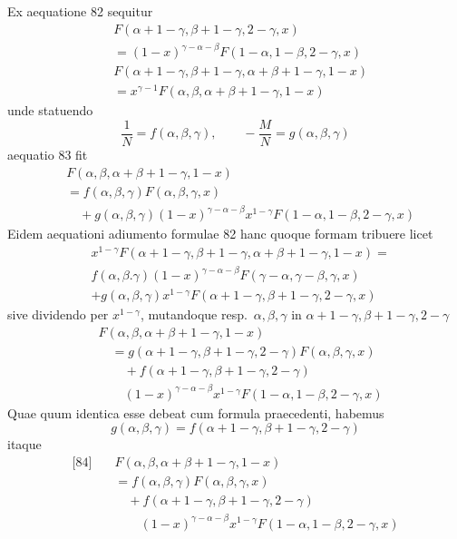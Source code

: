 
Ex aequatione 82 sequitur
\[
\begin{aligned}
&F(\alpha+1-\gamma,\beta+1-\gamma,2-\gamma,x)\\&=(1-x)^{\gamma-\alpha-\beta}F(1-\alpha,1-\beta,2-\gamma,x)\\[5pt]
&F(\alpha+1-\gamma,\beta+1-\gamma,\alpha+\beta+1-\gamma,1-x)\\&=x^{\gamma-1}F(\alpha,\beta,\alpha+\beta+1-\gamma,1-x)
\end{aligned}
\]
unde statuendo
\[
\frac{1}{N}=f(\alpha,\beta,\gamma),\qquad-\frac{M}{N}=g(\alpha,\beta,\gamma)
\]
aequatio 83 fit
\[
\begin{aligned}
&F(\alpha,\beta,\alpha+\beta+1-\gamma,1-x)\\&=f(\alpha,\beta,\gamma)F(\alpha,\beta,\gamma,x)\\
&\quad+g(\alpha,\beta,\gamma)(1-x)^{\gamma-\alpha-\beta}x^{1-\gamma}F(1-\alpha,1-\beta,2-\gamma,x)
\end{aligned}
\]
Eidem aequationi adiumento formulae 82 hanc quoque formam tribuere licet
\[
\begin{aligned}
&x^{1-\gamma}F(\alpha+1-\gamma,\beta+1-\gamma,\alpha+\beta+1-\gamma,1-x)=\\
&f(\alpha,\beta.\gamma)(1-x)^{\gamma-\alpha-\beta}F(\gamma-\alpha,\gamma-\beta,\gamma,x)
\\&+g(\alpha,\beta,\gamma)x^{1-\gamma}F(\alpha+1-\gamma,\beta+1-\gamma,2-\gamma,x)
\end{aligned}
\]
sive dividendo per \(x^{1-\gamma}\), mutandoque resp.\ \(\alpha,\beta,\gamma\) in \(\alpha+1-\gamma,\beta+1-\gamma,2-\gamma\)
\[
\begin{aligned}
&F(\alpha,\beta,\alpha+\beta+1-\gamma,1-x)\\
&\quad=g(\alpha+1-\gamma,\beta+1-\gamma,2-\gamma)F(\alpha,\beta,\gamma,x)\\
&\qquad+f(\alpha+1-\gamma,\beta+1-\gamma,2-\gamma)\\&\qquad(1-x)^{\gamma-\alpha-\beta}x^{1-\gamma}F(1-\alpha,1-\beta,2-\gamma,x)
\end{aligned}
\]
Quae quum identica esse debeat cum formula praecedenti, habemus
\[
g(\alpha,\beta,\gamma)=f(\alpha+1-\gamma,\beta+1-\gamma,2-\gamma)
\]
itaque
\[
\begin{aligned}
\text{[84]}\quad &F(\alpha,\beta,\alpha+\beta+1-\gamma,1-x)\\
&=f(\alpha,\beta,\gamma)F(\alpha,\beta,\gamma,x)\\
&\quad+f(\alpha+1-\gamma,\beta+1-\gamma,2-\gamma)\\&\qquad(1-x)^{\gamma-\alpha-\beta}x^{1-\gamma}F(1-\alpha,1-\beta,2-\gamma,x)
\end{aligned}
\]

